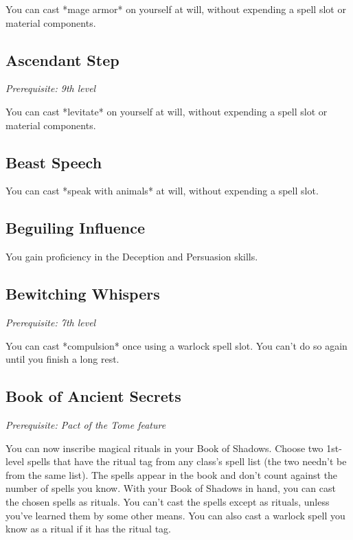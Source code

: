 You can cast *mage armor* on yourself at will, without expending a spell slot or material components.

\subsection{Ascendant Step}

\textit{Prerequisite: 9th level}

You can cast *levitate* on yourself at will, without expending a spell slot or material components.

\subsection{Beast Speech}

You can cast *speak with animals* at will, without expending a spell slot.

\subsection{Beguiling Influence}

You gain proficiency in the Deception and Persuasion skills.

\subsection{Bewitching Whispers}

\textit{Prerequisite: 7th level}

You can cast *compulsion* once using a warlock spell slot. You can’t do so again until you finish a long rest.

\subsection{Book of Ancient Secrets}

\textit{Prerequisite: Pact of the Tome feature}

You can now inscribe magical rituals in your Book of Shadows. Choose two 1st-level spells that have the ritual tag from any class’s spell list (the two needn’t be from the same list). The spells appear in the book and don’t count against the number of spells you know. With your Book of Shadows in hand, you can cast the chosen spells as rituals. You can’t cast the spells except as rituals, unless you’ve learned them by some other means. You can also cast a warlock spell you know as a ritual if it has the ritual tag.

